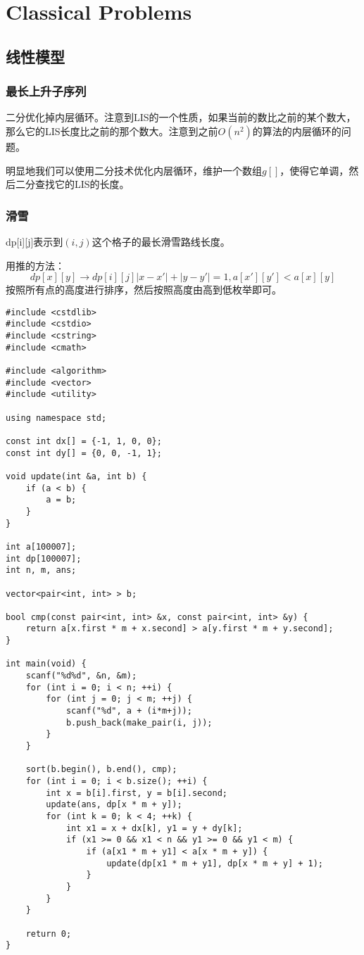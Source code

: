 \section{Classical Problems}
\subsection{线性模型}
\subsubsection{最长上升子序列}
二分优化掉内层循环。注意到LIS的一个性质，如果当前的数比之前的某个数大，那么它的LIS长度比之前的那个数大。注意到之前$O(n^2)$的算法的内层循环的问题。

明显地我们可以使用二分技术优化内层循环，维护一个数组$g[]$，使得它单调，然后二分查找它的LIS的长度。
\subsubsection{滑雪}

dp[i][j]表示到$(i,j)$这个格子的最长滑雪路线长度。

用推的方法：$$dp[x][y]\to dp[i][j]|x-x'|+|y-y'|=1,a[x'][y']<a[x][y]$$
按照所有点的高度进行排序，然后按照高度由高到低枚举即可。
\begin{verbatim}
#include <cstdlib>
#include <cstdio>
#include <cstring>
#include <cmath>

#include <algorithm>
#include <vector>
#include <utility>

using namespace std;

const int dx[] = {-1, 1, 0, 0};
const int dy[] = {0, 0, -1, 1};

void update(int &a, int b) {
    if (a < b) {
        a = b;
    }
}

int a[100007];
int dp[100007];
int n, m, ans;

vector<pair<int, int> > b;

bool cmp(const pair<int, int> &x, const pair<int, int> &y) {
    return a[x.first * m + x.second] > a[y.first * m + y.second];
}

int main(void) {
    scanf("%d%d", &n, &m);
    for (int i = 0; i < n; ++i) {
        for (int j = 0; j < m; ++j) {
            scanf("%d", a + (i*m+j));
            b.push_back(make_pair(i, j));
        }
    }

    sort(b.begin(), b.end(), cmp);
    for (int i = 0; i < b.size(); ++i) {
        int x = b[i].first, y = b[i].second;
        update(ans, dp[x * m + y]);
        for (int k = 0; k < 4; ++k) {
            int x1 = x + dx[k], y1 = y + dy[k];
            if (x1 >= 0 && x1 < n && y1 >= 0 && y1 < m) {
                if (a[x1 * m + y1] < a[x * m + y]) {
                    update(dp[x1 * m + y1], dp[x * m + y] + 1);
                }
            }
        }
    }

    return 0;
}
\end{verbatim}

